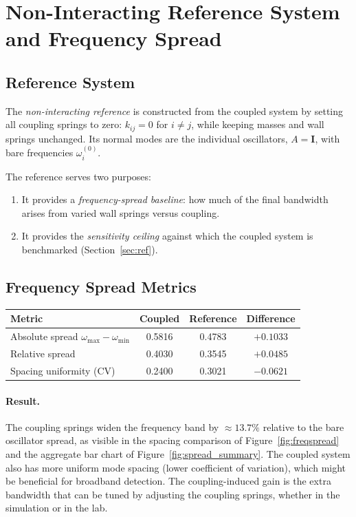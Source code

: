 \documentclass[11pt, letterpaper]{article}
\begin{document}
\section{Non-Interacting Reference System and Frequency Spread}

\subsection{Reference System}

The \emph{non-interacting reference} is constructed from the coupled system
by setting all coupling springs to zero: $k_{ij} = 0$ for $i \neq j$, while
keeping masses and wall springs unchanged.  Its normal modes are the
individual oscillators, $A = \mathbf{I}$, with bare frequencies
$\omega_i^{(0)}$.

The reference serves two purposes:
\begin{enumerate}[noitemsep]
  \item It provides a \emph{frequency-spread baseline}: how much of the
        final bandwidth arises from varied wall springs versus coupling.
  \item It provides the \emph{sensitivity ceiling} against which the coupled
        system is benchmarked (Section~\ref{sec:ref}).
\end{enumerate}

\subsection{Frequency Spread Metrics}

\begin{center}
\begin{tabular}{lccc}
  \toprule
  Metric & Coupled & Reference & Difference \\
  \midrule
  Absolute spread $\omega_{\max} - \omega_{\min}$ & 0.5816 & 0.4783 & $+0.1033$ \\
  Relative spread & 0.4030 & 0.3545 & $+0.0485$ \\
  Spacing uniformity (CV) & 0.2400 & 0.3021 & $-0.0621$ \\
  \bottomrule
\end{tabular}
\end{center}

\paragraph{Result.}
The coupling springs widen the frequency band by $\approx 13.7\%$ relative
to the bare oscillator spread, as visible in the spacing comparison of
Figure~\ref{fig:freqspread} and the aggregate bar chart of
Figure~\ref{fig:spread_summary}.  The coupled system also has more uniform
mode spacing (lower coefficient of variation), which might be beneficial for
broadband detection.  The coupling-induced gain is the extra bandwidth that
can be tuned by adjusting the coupling springs, whether in the simulation or
in the lab.
\end{document}
